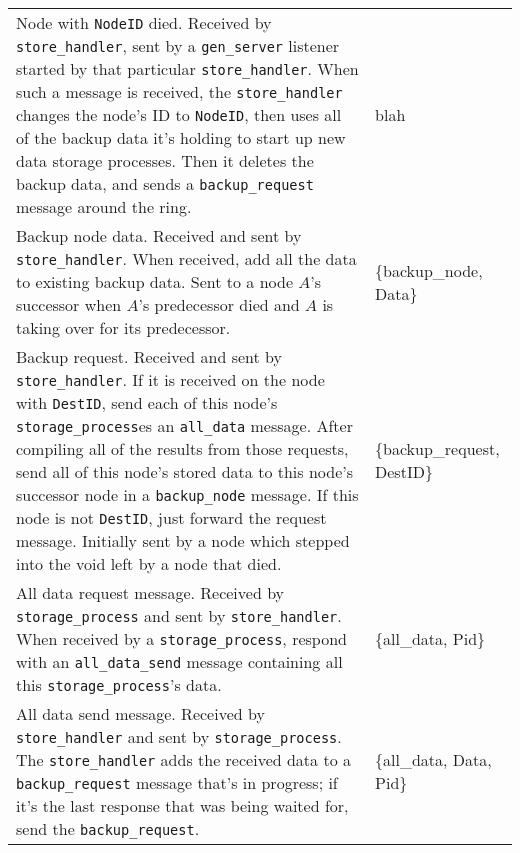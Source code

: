 \documentclass[12pt,letterpaper]{article}
\renewcommand{\tt}[1]{\texttt{#1}}
\newcommand{\sh}{\tt{store\_handler}}
\renewcommand{\sp}{\tt{storage\_process}}
\newcommand{\gs}{\tt{gen\_server}}
\begin{document}
\begin{longtable}{p{4.5in}T}
Node with \tt{NodeID} died.  Received by \sh, sent by a \gs{} listener started by that particular \sh.  When such a message is received, the \sh{} changes the node's ID to \tt{NodeID}, then uses all of the backup data it's holding to start up new data storage processes.  Then it deletes the backup data, and sends a \tt{backup\_request} message around the ring. & blah \\

Backup node data.  Received and sent by \sh.  When received, add all the data to existing backup data.  Sent to a node $A$'s successor when $A$'s predecessor died and $A$ is taking over for its predecessor.  & \{backup\_node, Data\} \\

Backup request.  Received and sent by \sh.  If it is received on the node with \tt{DestID}, send each of this node's \sp es an \tt{all\_data} message.  After compiling all of the results from those requests, send all of this node's stored data to this node's successor node in a \tt{backup\_node} message.  If this node is not \tt{DestID}, just forward the request message.  Initially sent by a node which stepped into the void left by a node that died.  & \{backup\_request, DestID\} \\

All data request message.  Received by \sp{} and sent by \sh.  When received by a \sp, respond with an \tt{all\_data\_send} message containing all this \sp's data.  & \{all\_data, Pid\} \\

All data send message.  Received by \sh{} and sent by \sp.  The \sh{} adds the received data to a \tt{backup\_request} message that's in progress; if it's the last response that was being waited for, send the \tt{backup\_request}. & \{all\_data, Data, Pid\}




\end{longtable}
\end{document}
